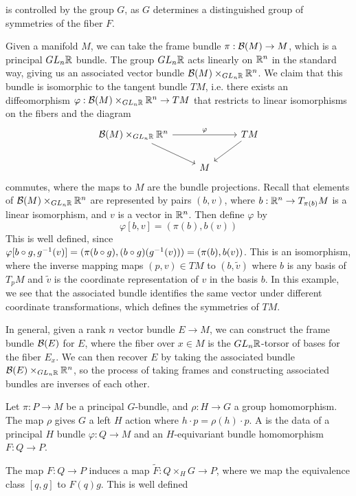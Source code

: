 is controlled by the group $G$, as $G$ determines a distinguished
group of symmetries of the fiber $F$.
%
\begin{exmp}
Given a manifold $M$, we can take the frame bundle $\pi : \mathcal{B}(M) \to M$, which is a
principal $GL_n\mathbb{R}$ bundle. The group $GL_n\mathbb{R}$ acts linearly on $\mathbb{R}^n$ in the
standard way, giving us an associated vector bundle $\mathcal{B}(M) \times_{GL_n\mathbb{R}} \mathbb{R}^n$.
We claim that this bundle is isomorphic to the tangent bundle $TM$, i.e. there
exists an diffeomorphism $\varphi : \mathcal{B}(M) \times_{GL_n\mathbb{R}} \mathbb{R}^n \to TM$ that
restricts to linear isomorphisms on the fibers and the diagram
\[\begin{tikzcd}
\B(M) \times_{GL_n\R} \R^n \ar[rr, "\varphi"] \ar[dr] && TM \ar[dl] \\
& M
\end{tikzcd}\]
commutes, where the maps to $M$ are the bundle projections. Recall that
elements of $\mathcal{B}(M) \times_{GL_n\mathbb{R}} \mathbb{R}^n$ are represented by pairs $(b, v)$,
where $b: \mathbb{R}^n \to T_{\pi(b)}M$ is a linear isomorphism, and $v$ is a vector in $\mathbb{R}^n$.
Then define $\varphi$ by
\[
\varphi[b,v] = (\pi(b), b(v))
\]
This is well defined, since $\varphi[b\circ g, g^{-1}(v)] = (\pi(b \circ g),
(b\circ g)(g^{-1}(v))) = (\pi(b), b(v))$. This is an isomorphism, where the
inverse mapping maps $(p,v) \in TM$ to $(b, \tilde{v})$ where $b$ is any
basis of $T_pM$ and $\tilde{v}$ is the coordinate representation of $v$ in the
basis $b$. In this example, we see that the associated bundle identifies the same vector
under different coordinate transformations, which defines the symmetries of
$TM$.
\end{exmp}
%
In general, given a rank $n$ vector bundle $E \to M$, we can construct the
frame bundle  $\mathcal{B}(E)$ for $E$, where the fiber over $x \in M$ is the
$GL_n\mathbb{R}$-torsor of bases for the fiber $E_x$. We can then
recover $E$ by taking the associated bundle
$\mathcal{B}(E) \times_{GL_n\mathbb{R}} \mathbb{R}^n$, so the process of taking frames and constructing
associated bundles are inverses of each other.
%
\begin{defn}
Let $\pi : P \to M$ be a principal $G$-bundle, and $\rho : H \to G$ a group
homomorphism. The map $\rho$ gives $G$ a left $H$ action where
$h \cdot p = \rho(h) \cdot p$. A  is the
data of a principal $H$ bundle $\varphi : Q \to M$ and an $H$-equivariant bundle
homomorphism $F : Q \to P$.
\end{defn}
%
The map $F : Q \to P$ induces a map $\tilde{F} : Q \times_H G \to P$, where we
map the equivalence class $[q,g]$ to $F(q) g$. This is well defined
